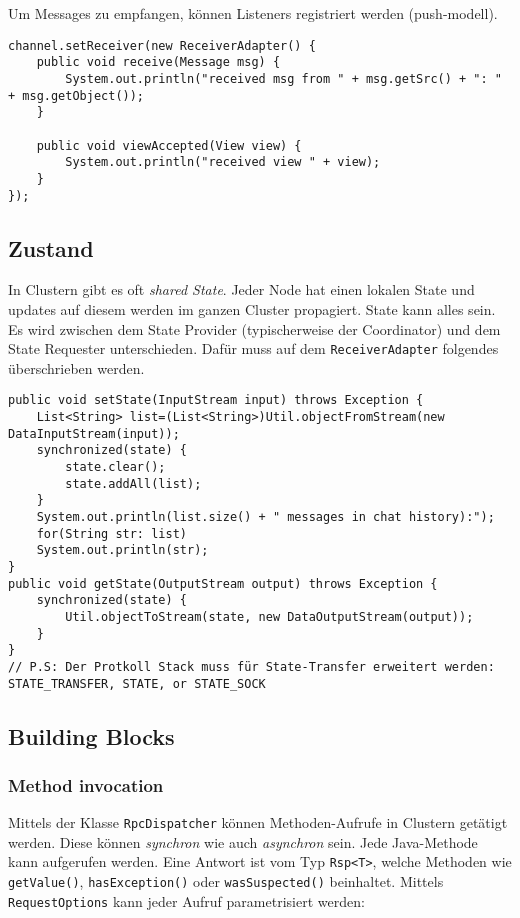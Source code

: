 Um Messages zu empfangen, können Listeners registriert werden (push-modell).

\begin{lstlisting}
channel.setReceiver(new ReceiverAdapter() {
	public void receive(Message msg) {
		System.out.println("received msg from " + msg.getSrc() + ": " + msg.getObject());
	}

	public void viewAccepted(View view) {
		System.out.println("received view " + view);
	}
});
\end{lstlisting}
	
\subsection{Zustand}

In Clustern gibt es oft \emph{shared State}. Jeder Node hat einen lokalen State und updates auf diesem werden im ganzen Cluster propagiert. State kann alles sein. Es wird  zwischen dem State Provider (typischerweise der Coordinator) und dem State Requester unterschieden. Dafür muss auf dem \verb|ReceiverAdapter| folgendes überschrieben werden. 

\begin{lstlisting}
public void setState(InputStream input) throws Exception {
	List<String> list=(List<String>)Util.objectFromStream(new DataInputStream(input));
	synchronized(state) {
		state.clear();
		state.addAll(list);
	}
	System.out.println(list.size() + " messages in chat history):");
	for(String str: list)
	System.out.println(str);
}
public void getState(OutputStream output) throws Exception {
	synchronized(state) {
		Util.objectToStream(state, new DataOutputStream(output));
	}
}
// P.S: Der Protkoll Stack muss für State-Transfer erweitert werden: STATE_TRANSFER, STATE, or STATE_SOCK
\end{lstlisting}

\subsection{Building Blocks}

\subsubsection{Method invocation}

Mittels der Klasse \verb|RpcDispatcher| können Methoden-Aufrufe in Clustern getätigt werden. Diese können \emph{synchron} wie auch \emph{asynchron} sein. Jede Java-Methode kann aufgerufen werden. Eine Antwort ist vom Typ \verb|Rsp<T>|, welche Methoden wie \verb|getValue()|, \verb|hasException()| oder \verb|wasSuspected()| beinhaltet. Mittels \verb|RequestOptions| kann jeder Aufruf parametrisiert werden:
	
